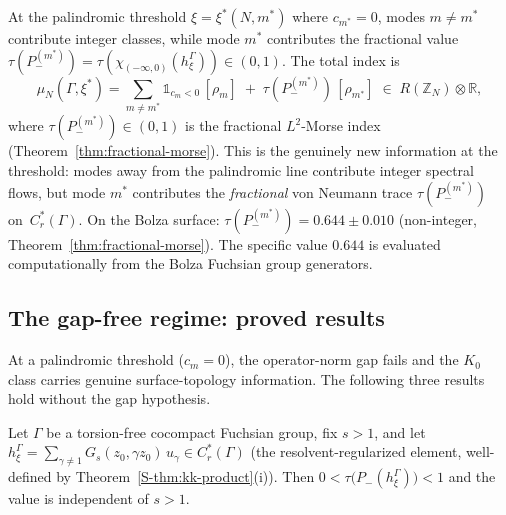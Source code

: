 \begin{corollary}
\label{cor:kk-threshold}
At the palindromic threshold $\xi = \xi^*(N, m^*)$
where $c_{m^*} = 0$, modes $m \ne m^*$ contribute
integer classes, while mode $m^*$ contributes the
fractional value
$\tau(P_-^{(m^*)}) = \tau(\chi_{(-\infty,0)}(h_\xi^\Gamma))
\in (0, 1)$.
The total index is
\[
  \mu_N(\Gamma, \xi^*)
  = \!\sum_{m \ne m^*}\!\mathbb{1}_{c_m < 0}\,[\rho_m]
  \;+\; \tau(P_-^{(m^*)})\,[\rho_{m^*}]
  \;\in\; R(\mathbb{Z}_N) \otimes \mathbb{R},
\]
where $\tau(P_-^{(m^*)}) \in (0, 1)$ is the fractional
$L^2$-Morse index (Theorem~\ref{thm:fractional-morse}).
This is the genuinely new information at the threshold:
modes away from the palindromic line contribute integer
spectral flows, but mode $m^*$ contributes the
\emph{fractional} von Neumann trace
$\tau(P_-^{(m^*)})$ on~$C^*_r(\Gamma)$.
On the Bolza surface: $\tau(P_-^{(m^*)}) = 0.644 \pm 0.010$
(non-integer, Theorem~\ref{thm:fractional-morse}).
The specific value $0.644$ is evaluated computationally from
the Bolza Fuchsian group generators.
\end{corollary}

\subsection{The gap-free regime: proved results}
\label{sec:gap-free}

At a palindromic threshold ($c_m = 0$), the operator-norm
gap fails and the $K_0$ class carries genuine
surface-topology information.
The following three results hold without the gap hypothesis.

\begin{theorem}
\label{thm:fractional-morse}
Let $\Gamma$ be a torsion-free cocompact Fuchsian group,
fix $s > 1$, and let
$h_\xi^\Gamma = \sum_{\gamma \ne 1} G_s
(z_0, \gamma z_0)\, u_\gamma \in C^*_r(\Gamma)$
(the resolvent-regularized element, well-defined
by Theorem~\ref*{S-thm:kk-product}(i)).
Then
$0 < \tau\bigl(P_-(h_\xi^\Gamma)\bigr) < 1$
and the value is independent of $s > 1$.
\end{theorem}

